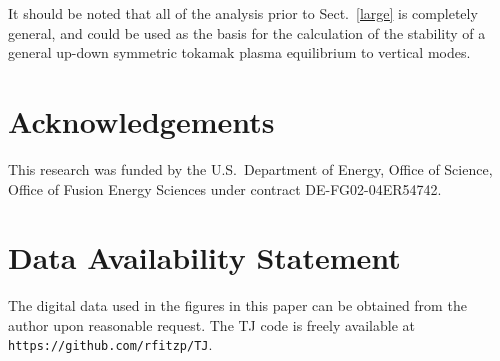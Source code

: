 \documentclass[12pt,prb,aps]{revtex4-1}
\begin{document}
It should be noted that all of the analysis prior to Sect.~\ref{large} is completely general, and could be used as the basis for the calculation of the
stability of a general up-down symmetric tokamak plasma equilibrium to vertical modes. 

\section*{Acknowledgements}
This research was funded by the  U.S.\ Department of Energy, Office of Science, Office of Fusion Energy Sciences under contract DE-FG02-04ER54742.

\section*{Data Availability Statement}
The digital data used in the figures in this paper can be obtained from the author upon reasonable request. The TJ code is freely 
available at {\tt https://github.com/rfitzp/TJ}. 
\end{document}
